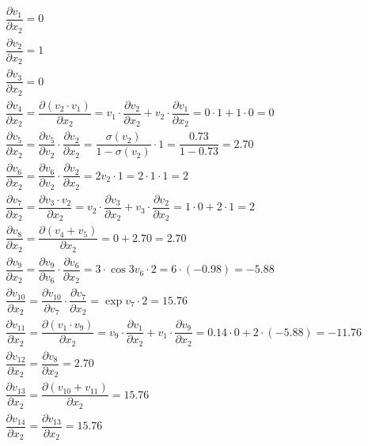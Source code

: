 \documentclass[12pt]{article}
\begin{document}
\begin{enumerate}[label=(\roman*)]
    

\begin{equation*}
    

\begin{align*}


\dfrac{\partial v_{1}}{\partial x_{2}} =  0 && \\
\dfrac{\partial v_{2}}{\partial x_{2}} =  1 && \\
\dfrac{\partial v_{3}}{\partial x_{2}} = 0 && \\
\dfrac{\partial v_{4}}{\partial x_{2}} = \dfrac{\partial (v_{2}\cdot v_1)}{\partial x_{2}} = v_1\cdot\dfrac{\partial v_{2}}{\partial x_{2}} + v_2\cdot\dfrac{\partial v_{1}}{\partial x_{2}} = 0\cdot 1 + 1\cdot 0 = 0  && \\
\dfrac{\partial v_{5}}{\partial x_{2}} = \dfrac{\partial v_{5}}{\partial v_{2}}\cdot \dfrac{\partial v_{2}}{\partial x_{2}} =  \dfrac{\sigma(v_2)}{1-\sigma(v_2)} \cdot 1 = \dfrac{0.73}{1-0.73} = 2.70  && \\ 
\dfrac{\partial v_{6}}{\partial x_{2}} = \dfrac{\partial v_{6}}{\partial v_{2}} \cdot \dfrac{\partial v_{2}}{\partial x_{2}} = 2 v_2 \cdot 1 = 2 \cdot 1 \cdot 1 = 2 && \\
\dfrac{\partial v_{7}}{\partial x_{2}} = \dfrac{\partial v_{3}\cdot v_2}{\partial x_{2}} = v_2 \cdot \dfrac{\partial v_{3}}{\partial x_{2}} + v_3 \cdot \dfrac{\partial v_{2}}{\partial x_{2}} = 1 \cdot 0 + 2 \cdot 1 = 2 && \\ 
\dfrac{\partial v_{8}}{\partial x_{2}} = \dfrac{\partial (v_{4} + v_5)}{\partial x_{2}} = 0 + 2.70 = 2.70 && \\
\dfrac{\partial v_{9}}{\partial x_{2}} = \dfrac{\partial v_{9}}{\partial v_{6}} \cdot \dfrac{\partial v_{6}}{\partial x_{2}} = 3 \cdot \cos{3v_6} \cdot 2 =  6 \cdot (-0.98) = -5.88 && \\
\dfrac{\partial v_{10}}{\partial x_{2}} = \dfrac{\partial v_{10}}{\partial v_{7}} \cdot \dfrac{\partial v_{7}}{\partial x_{2}}  = \exp{v_7} \cdot 2 = 15.76 && \\
\dfrac{\partial v_{11}}{\partial x_{2}} = \dfrac{\partial (v_{1}\cdot v_9)}{\partial x_{2}} = v_9\cdot\dfrac{\partial v_{1}}{\partial x_{2}} + v_1\cdot\dfrac{\partial v_{9}}{\partial x_{2}} = 0.14 \cdot 0 + 2\cdot (-5.88) = -11.76 && \\
\dfrac{\partial v_{12}}{\partial x_{2}} = \dfrac{\partial v_{8}}{\partial x_{2}} = 2.70 && \\
\dfrac{\partial v_{13}}{\partial x_{2}} = \dfrac{\partial (v_{10} + v_11)}{\partial x_{2}} = 15.76  \\
\dfrac{\partial v_{14}}{\partial x_{2}} = \dfrac{\partial v_{13}}{\partial x_{2}}  = 15.76 \\


\end{align*}
\end{equation*}
\end{enumerate}
\end{document}

